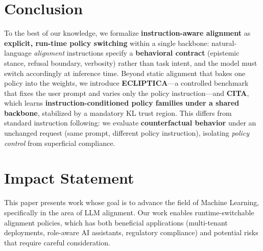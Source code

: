 \documentclass{article}
\begin{document}







\section{Conclusion}
\label{sec:conclusion}

To the best of our knowledge, we formalize \textbf{instruction-aware alignment} as \textbf{explicit, run-time policy switching} within a single backbone: natural-language \emph{alignment} instructions specify a \textbf{behavioral contract} (epistemic stance, refusal boundary, verbosity) rather than task intent, and the model must switch accordingly at inference time. Beyond static alignment that bakes one policy into the weights, we introduce \textbf{ECLIPTICA}—a controlled benchmark that fixes the user prompt and varies only the policy instruction—and \textbf{CITA}, which learns \textbf{instruction-conditioned policy families} \textbf{under a shared backbone}, stabilized by a mandatory KL trust region. This differs from standard instruction following: we evaluate \textbf{counterfactual behavior} under an unchanged request (same prompt, different policy instruction), isolating \emph{policy control} from superficial compliance.










\clearpage
\newpage




\section*{Impact Statement}

This paper presents work whose goal is to advance the field of Machine Learning, specifically in the area of LLM alignment. Our work enables runtime-switchable alignment policies, which has both beneficial applications (multi-tenant deployments, role-aware AI assistants, regulatory compliance) and potential risks that require careful consideration.
\end{document}
